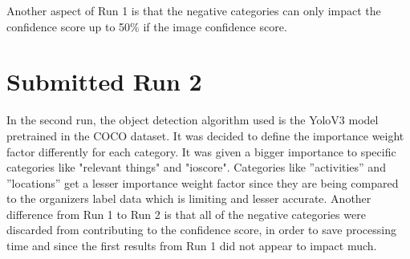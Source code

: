     Another aspect of Run 1 is that the negative categories can only impact the confidence score up to 50\% if the image confidence score.
    
 

    \section{Submitted Run 2}
    \label{sec:run2}
    
    In the second run, the object detection algorithm used is the YoloV3 model pretrained in the COCO dataset.  It was decided to define the importance weight factor differently for each category. It was given a bigger importance to specific categories like "relevant things" and "ioscore". Categories like ”activities” and ”locations” get a lesser importance weight factor since they are being compared to the organizers label data which is limiting and lesser accurate.  Another difference from Run 1 to Run 2 is that all of the negative categories were discarded from contributing to the confidence score, in order to save processing time and since the first results from Run 1 did not appear to impact much.
    
